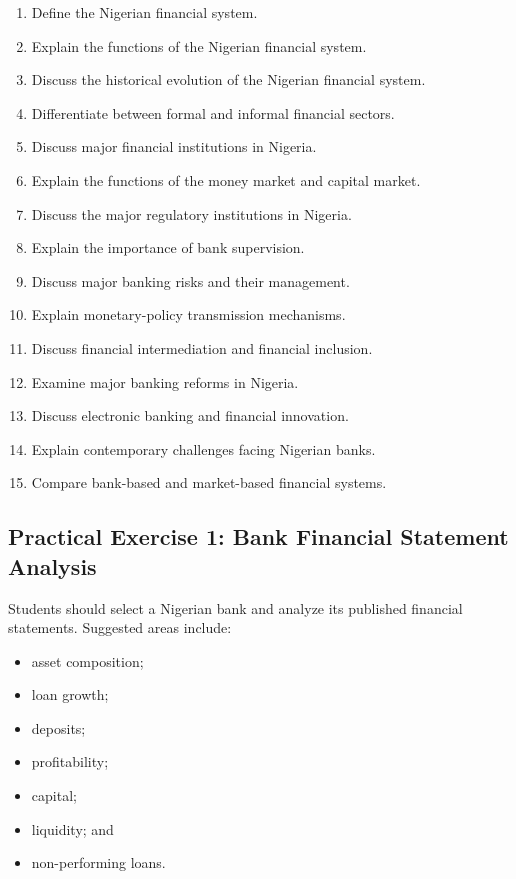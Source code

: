 \documentclass[
]{article}
\providecommand{\tightlist}{%
  \setlength{\itemsep}{0pt}\setlength{\parskip}{0pt}}
\begin{document}
\begin{enumerate}
\def\labelenumi{\arabic{enumi}.}
\tightlist
\item
  Define the Nigerian financial system.
\item
  Explain the functions of the Nigerian financial system.
\item
  Discuss the historical evolution of the Nigerian financial system.
\item
  Differentiate between formal and informal financial sectors.
\item
  Discuss major financial institutions in Nigeria.
\item
  Explain the functions of the money market and capital market.
\item
  Discuss the major regulatory institutions in Nigeria.
\item
  Explain the importance of bank supervision.
\item
  Discuss major banking risks and their management.
\item
  Explain monetary-policy transmission mechanisms.
\item
  Discuss financial intermediation and financial inclusion.
\item
  Examine major banking reforms in Nigeria.
\item
  Discuss electronic banking and financial innovation.
\item
  Explain contemporary challenges facing Nigerian banks.
\item
  Compare bank-based and market-based financial systems.
\end{enumerate}

\subsection{Practical Exercise 1: Bank Financial Statement Analysis}\label{practical-exercise-1-bank-financial-statement-analysis}

Students should select a Nigerian bank and analyze its published financial statements. Suggested areas include:

\begin{itemize}
\tightlist
\item
  asset composition;
\item
  loan growth;
\item
  deposits;
\item
  profitability;
\item
  capital;
\item
  liquidity; and
\item
  non-performing loans.
\end{itemize}
\end{document}
